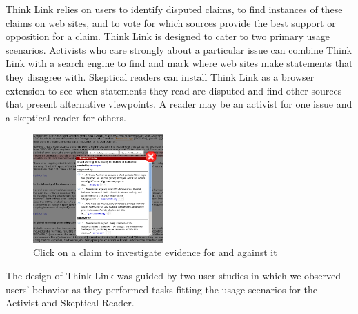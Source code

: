 \documentclass{chi2009}
\newcommand{\todo}[1]{}
\begin{document}
Think Link relies on users to identify disputed claims, to find instances of these claims on web sites, and to vote for which sources provide the best support or opposition for a claim. 
Think Link is designed to cater to two primary usage scenarios. %
Activists who care strongly about a particular issue can combine Think Link with a search engine to find and mark where web sites make statements that they disagree with.  %
Skeptical readers can install Think Link as a browser extension to see when statements they read are disputed and find other sources that present alternative viewpoints. %
A reader may be an activist for one issue and a skeptical reader for others.


\begin{figure}[tb]
	\begin{center}
	\includegraphics[width=5cm]{../screenshots/v2_popup_dim.png}
	\caption{Click on a claim to investigate evidence for and against it}
	\label{claimview}
	\end{center}
\end{figure}

\todo{Claim panel should have 'more' buttons}


The design of Think Link was guided by two user studies in which we observed users' behavior as they performed tasks fitting the usage scenarios for the Activist and Skeptical Reader. %

\todo{Talk about automatically including all arguments from Snopes}
\todo{I think we need to do some kind of evaluation of the new interface, even if it is just showing it to some people, or having people in the lab try it.}
\todo{Need figures saying how efficient it is for an activist user to mark up a topic}

\end{document}
